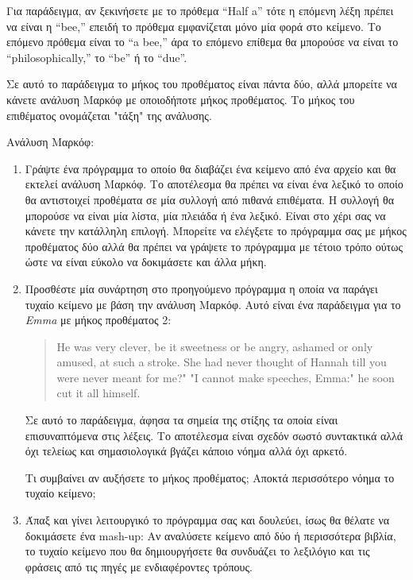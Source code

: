 \documentclass[10pt]{book}
\begin{document}
Για παράδειγμα, αν ξεκινήσετε με το πρόθεμα ``Half a'' τότε η επόμενη λέξη πρέπει να είναι η ``bee,'' επειδή 
το πρόθεμα εμφανίζεται μόνο μία φορά στο κείμενο. Το επόμενο πρόθεμα είναι το ``a bee,''  άρα το επόμενο επίθεμα θα μπορούσε να είναι το ``philosophically,'' το ``be'' ή το ``due''.

Σε αυτό το παράδειγμα το μήκος του προθέματος είναι πάντα δύο, αλλά μπορείτε να κάνετε ανάλυση Μαρκόφ με οποιοδήποτε μήκος προθέματος. Το μήκος του επιθέματος ονομάζεται "τάξη" της ανάλυσης.
\\
\begin{exercise}

Ανάλυση Μαρκόφ:

\begin{enumerate}

\item  Γράψτε ένα πρόγραμμα το οποίο θα διαβάζει ένα κείμενο από ένα αρχείο και θα εκτελεί ανάλυση Μαρκόφ. 
Το αποτέλεσμα θα πρέπει να είναι ένα λεξικό το οποίο θα αντιστοιχεί προθέματα σε μία συλλογή από πιθανά επιθέματα. Η συλλογή θα μπορούσε να είναι μία λίστα, μία πλειάδα ή ένα λεξικό. Είναι στο χέρι σας να κάνετε την κατάλληλη επιλογή. Μπορείτε να ελέγξετε το πρόγραμμα σας με μήκος προθέματος δύο αλλά θα πρέπει να γράψετε το πρόγραμμα με τέτοιο τρόπο ούτως ώστε να είναι εύκολο να δοκιμάσετε και άλλα μήκη. 

\item  Προσθέστε μία συνάρτηση στο προηγούμενο πρόγραμμα η οποία να παράγει τυχαίο κείμενο με βάση την ανάλυση Μαρκόφ. Αυτό είναι ένα παράδειγμα για το {\em Emma} με μήκος προθέματος 2:

\begin{quote}
He was very clever, be it sweetness or be angry, ashamed or only
amused, at such a stroke. She had never thought of Hannah till you
were never meant for me?" "I cannot make speeches, Emma:" he soon cut
it all himself.
\end{quote}

Σε αυτό το παράδειγμα, άφησα τα σημεία της στίξης τα οποία είναι επισυναπτόμενα στις λέξεις. Το αποτέλεσμα είναι σχεδόν σωστό συντακτικά αλλά όχι τελείως και σημασιολογικά βγάζει κάποιο νόημα αλλά όχι αρκετό. 

Τι συμβαίνει αν αυξήσετε το μήκος προθέματος; Αποκτά περισσότερο νόημα το τυχαίο κείμενο;

\item  Άπαξ και γίνει λειτουργικό το πρόγραμμα σας και δουλεύει, ίσως θα θέλατε να δοκιμάσετε ένα  mash-up: 
Αν αναλύσετε κείμενο από δύο ή περισσότερα βιβλία, το τυχαίο κείμενο που θα δημιουργήσετε θα συνδυάζει το λεξιλόγιο και τις φράσεις από τις πηγές με ενδιαφέροντες τρόπους.


\end{enumerate}
\end{exercise}
\end{document}
